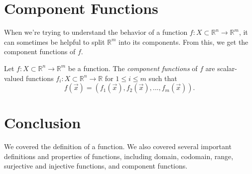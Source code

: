 \documentclass{ximera}
\begin{document}
\section*{Component Functions}

When we're trying to understand the behavior of a function $f:X\subset \mathbb{R}^n\rightarrow \mathbb{R}^m$, it can sometimes be helpful to split $\mathbb{R}^m$ into its components. From this, we get the component functions of $f$.

\begin{definition}
Let $f:X\subset \mathbb{R}^n\rightarrow \mathbb{R}^m$ be a function. The \emph{component functions} of $f$ are scalar-valued functions $f_i:X\subset\mathbb{R}^n\rightarrow\mathbb{R}$ for $1\leq i\leq m$ such that 
\[
f(\vec{x}) = (f_1(\vec{x}),f_2(\vec{x}),...,f_m(\vec{x})).
\]
\end{definition}

\section*{Conclusion}

We covered the definition of a function. We also covered several important definitions and properties of functions, including domain, codomain, range, surjective and injective functions, and component functions.
\end{document}

